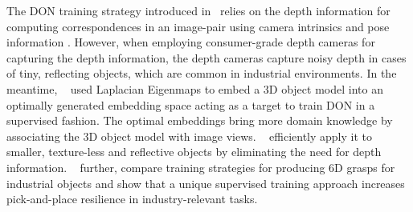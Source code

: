 The DON training strategy introduced in~\cite{florence2018dense} relies on the depth information for computing correspondences in an image-pair using
camera intrinsics and pose information \cite{hartley2003multiple}.
However, when employing consumer-grade depth cameras for capturing the depth information,
the depth cameras capture noisy depth in cases of tiny, reflecting objects, which are common in
industrial environments. In the meantime, \citeauthor{kupcsik2021supervised}~\cite{kupcsik2021supervised} used Laplacian Eigenmaps \cite{belkin2003laplacian}
to embed a 3D object model into an optimally generated embedding space acting as a target to train DON in a supervised fashion.
The optimal embeddings bring more domain knowledge by associating the 3D object model with image views.
\citeauthor{kupcsik2021supervised}~\cite{kupcsik2021supervised} efficiently apply it to smaller, texture-less and
reflective objects by eliminating the need for depth information. \citeauthor{kupcsik2021supervised}~\cite{kupcsik2021supervised}
further, compare training strategies for producing 6D grasps for industrial objects and show that a unique supervised training approach
increases pick-and-place resilience in industry-relevant tasks.

